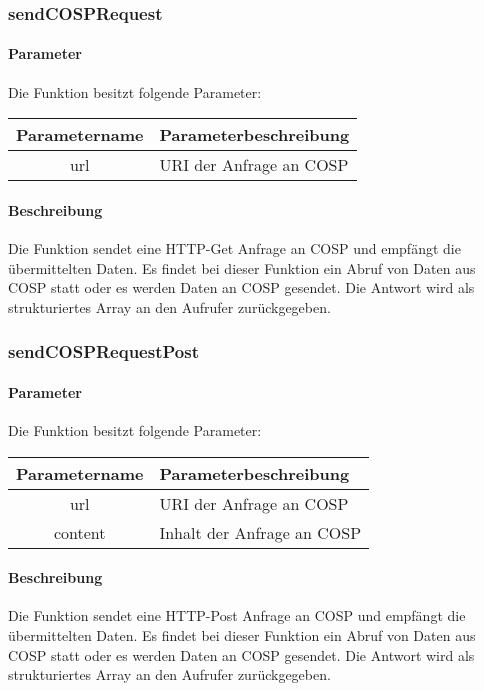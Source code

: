 \subsubsection{sendCOSPRequest}
\paragraph{Parameter} Die Funktion besitzt folgende Parameter:
\begin{table}[H]
	\begin{tabular}{|c|p{11cm}|}
		\hline
		\textbf{Parametername} & \textbf{Parameterbeschreibung} \\ \hline
		url & URI der Anfrage an {\glqq COSP\grqq} \\ \hline
	\end{tabular}
\end{table}
\paragraph{Beschreibung} Die Funktion sendet eine HTTP-Get Anfrage an {\glqq COSP\grqq} und empfängt die übermittelten Daten. Es findet bei dieser Funktion ein Abruf von Daten aus {\glqq COSP\grqq} statt oder es werden Daten an {\glqq COSP\grqq} gesendet. Die Antwort wird als strukturiertes Array an den Aufrufer zurückgegeben.
\subsubsection{sendCOSPRequestPost}
\paragraph{Parameter} Die Funktion besitzt folgende Parameter:
\begin{table}[H]
	\begin{tabular}{|c|p{11cm}|}
		\hline
		\textbf{Parametername} & \textbf{Parameterbeschreibung} \\ \hline
		url     & URI der Anfrage an {\glqq COSP\grqq} \\ \hline
		content & Inhalt der Anfrage an {\glqq COSP\grqq} \\ \hline
	\end{tabular}
\end{table}
\paragraph{Beschreibung} Die Funktion sendet eine HTTP-Post Anfrage an {\glqq COSP\grqq} und empfängt die übermittelten Daten. Es findet bei dieser Funktion ein Abruf von Daten aus {\glqq COSP\grqq} statt oder es werden Daten an {\glqq COSP\grqq} gesendet. Die Antwort wird als strukturiertes Array an den Aufrufer zurückgegeben.
